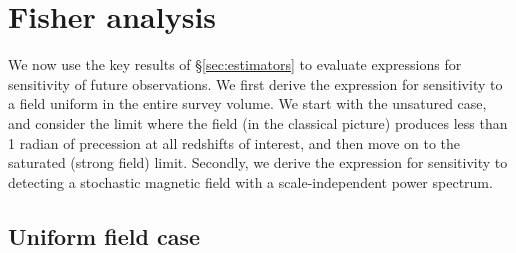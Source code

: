 \section{Fisher analysis}
\label{sec:fisher}

We now use the key results of \S\ref{sec:estimators} to evaluate expressions for sensitivity of future observations. We first derive the expression for sensitivity to a field uniform in the entire survey volume. We start with the unsatured case, and consider the limit where the field (in the classical picture) produces less than 1 radian of precession at all redshifts of interest, and then move on to the saturated (strong field) limit. Secondly, we derive the expression for sensitivity to detecting a stochastic magnetic field with a scale-independent power spectrum.

\subsection{Uniform field case}
\label{subsec:uniform_fisher}

